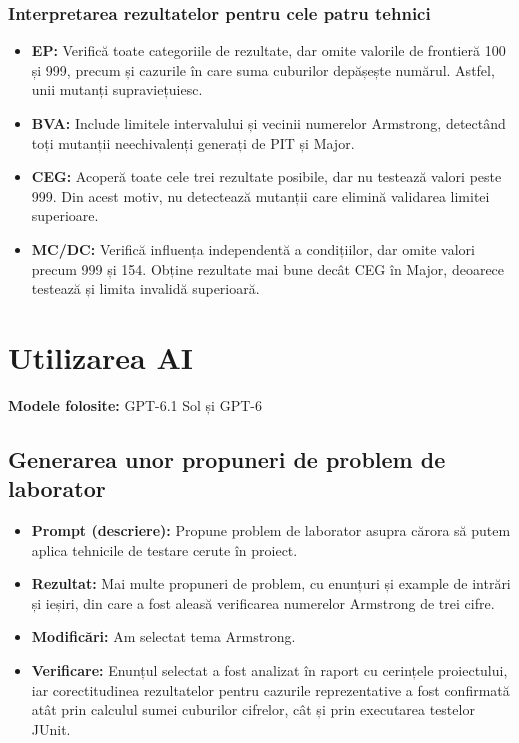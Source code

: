 \documentclass[11pt,a4paper]{article}
\begin{document}
\subsubsection{Interpretarea rezultatelor pentru cele patru tehnici}
\begin{itemize}
    \item \textbf{EP:} Verifică toate categoriile de rezultate,
    dar omite valorile de frontieră 100 și 999, precum și
    cazurile în care suma cuburilor depășește numărul.
    Astfel, unii mutanți supraviețuiesc.

    \item \textbf{BVA:} Include limitele intervalului și
    vecinii numerelor Armstrong, detectând toți mutanții
    neechivalenți generați de PIT și Major.

    \item \textbf{CEG:} Acoperă toate cele trei rezultate
    posibile, dar nu testează valori peste 999.
    Din acest motiv, nu detectează mutanții care
    elimină validarea limitei superioare.

    \item \textbf{MC/DC:} Verifică influența independentă
    a condițiilor, dar omite valori precum 999 și 154.
    Obține rezultate mai bune decât CEG în Major,
    deoarece testează și limita invalidă superioară.
\end{itemize}

\section{Utilizarea AI}
\textbf{Modele folosite:} GPT-6.1 Sol și GPT-6

\subsection{Generarea unor propuneri de problem de laborator}
\begin{itemize}[label=\textendash]
\item \textbf{Prompt (descriere):} Propune problem de laborator asupra cărora să putem aplica tehnicile de testare cerute în proiect.
\item \textbf{Rezultat:} Mai multe propuneri de problem, cu enunțuri și example de intrări și ieșiri, din care a fost aleasă verificarea numerelor Armstrong de trei cifre.
\item \textbf{Modificări:} Am selectat tema Armstrong.
\item \textbf{Verificare:} Enunțul selectat a fost analizat în raport cu cerințele proiectului, iar corectitudinea rezultatelor pentru cazurile reprezentative a fost confirmată atât prin calculul sumei cuburilor cifrelor, cât și prin executarea testelor JUnit.
\end{itemize}
\end{document}
